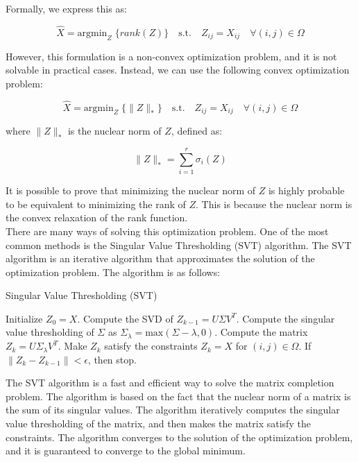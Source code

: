 Formally, we express this as:

\begin{equation}
    \hat{X} = \text{argmin}_{Z} \; \{rank(Z)\} \quad \text{s.t.} \quad Z_{ij} = X_{ij} \quad \forall (i,j) \in \Omega
\end{equation}

However, this formulation is a non-convex optimization problem, and it is not solvable in practical
cases. Instead, we can use the following convex optimization problem:

\begin{equation}
    \hat{X} = \text{argmin}_{Z} \; \{\|Z\|_*\} \quad \text{s.t.} \quad Z_{ij} = X_{ij} \quad \forall (i,j) \in \Omega
\end{equation}

where $\|Z\|_*$ is the nuclear norm of $Z$, defined as:

\begin{equation}
    \|Z\|_* = \sum_{i=1}^r \sigma_i(Z)
\end{equation}

It is possible to prove that minimizing the nuclear norm of $Z$ is highly probable to be equivalent to
minimizing the rank of $Z$. This is because the nuclear norm is the convex relaxation of the rank function.\\

There are many ways of solving this optimization problem. One of the most common methods is the Singular Value
Thresholding (SVT) algorithm. The SVT algorithm is an iterative algorithm that approximates the solution of the
optimization problem. The algorithm is as follows:

\begin{algorithm}[H]
    \caption{Singular Value Thresholding (SVT)}
    \begin{algorithmic}[1]
        \State Initialize $Z_0 = X$.
            \State Compute the SVD of $Z_{k-1} = U \Sigma V^T$.
            \State Compute the singular value thresholding of $\Sigma$ as $\Sigma_{\lambda} = \text{max}(\Sigma - \lambda, 0)$.
            \State Compute the matrix $Z_k = U \Sigma_{\lambda} V^T$.
            \State Make $Z_k$ satisfy the constraints $Z_k = X$ for $(i,j) \in \Omega$.
            \State If $\|Z_k - Z_{k-1}\| < \epsilon$, then stop.
        \EndFor
    \end{algorithmic}
\end{algorithm}

The SVT algorithm is a fast and efficient way to solve the matrix completion problem. The algorithm is based on the
fact that the nuclear norm of a matrix is the sum of its singular values. The algorithm iteratively computes the
singular value thresholding of the matrix, and then makes the matrix satisfy the constraints. The algorithm converges
to the solution of the optimization problem, and it is guaranteed to converge to the global minimum.


